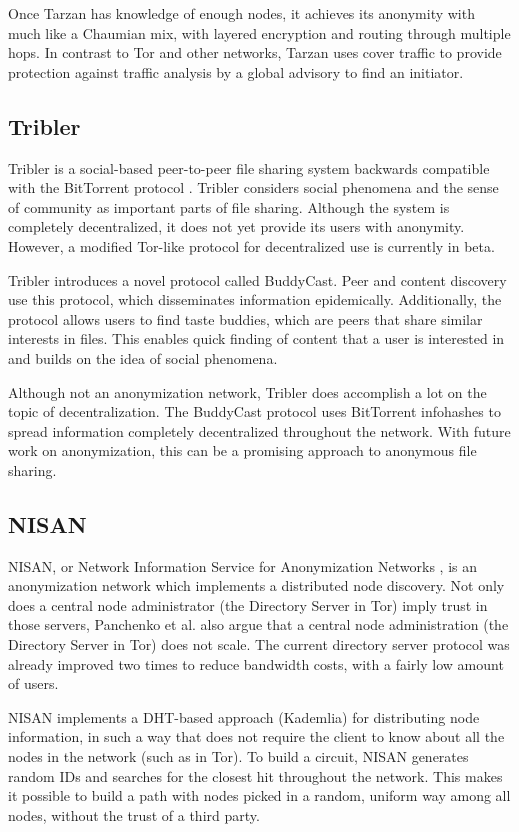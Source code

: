 \documentclass{article}
\begin{document}
		Once Tarzan has knowledge of enough nodes, it achieves its anonymity with much like a Chaumian mix, with layered encryption and routing through multiple hops. In contrast to Tor and other networks, Tarzan uses cover traffic to provide protection against traffic analysis by a global advisory to find an initiator.
		
	\subsection{Tribler} %
		Tribler is a social-based peer-to-peer file sharing system backwards compatible with the BitTorrent protocol \cite{pouwelse2008tribler}. Tribler considers social phenomena and the sense of community as important parts of file sharing. Although the system is completely decentralized, it does not yet provide its users with anonymity. However, a modified Tor-like protocol for decentralized use is currently in beta.
		
		Tribler introduces a novel protocol called BuddyCast. Peer and content discovery use this protocol, which disseminates information epidemically. Additionally, the protocol allows users to find taste buddies, which are peers that share similar interests in files. This enables quick finding of content that a user is interested in and builds on the idea of social phenomena.
		
		Although not an anonymization network, Tribler does accomplish a lot on the topic of decentralization. The BuddyCast protocol uses BitTorrent infohashes to spread information completely decentralized throughout the network. With future work on anonymization, this can be a promising approach to anonymous file sharing.

	\subsection{NISAN} %
		NISAN, or Network Information Service for Anonymization Networks \cite{panchenko2006nisan}, is an anonymization network which implements a distributed node discovery. Not only does a central node administrator (the Directory Server in Tor) imply trust in those servers, Panchenko et al. also argue that a central node administration (the Directory Server in Tor) does not scale. The current directory server protocol was already improved two times to reduce bandwidth costs, with a fairly low amount of users.
		
		NISAN implements a DHT-based approach (Kademlia) for distributing node information, in such a way that does not require the client to know about all the nodes in the network (such as in Tor). To build a circuit, NISAN generates random IDs and searches for the closest hit throughout the network. This makes it possible to build a path with nodes picked in a random, uniform way among all nodes, without the trust of a third party.
		
\end{document}

